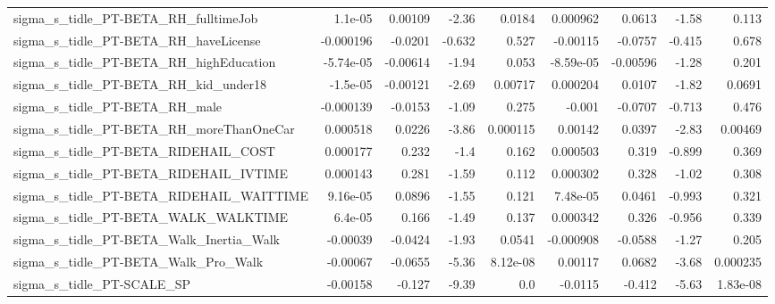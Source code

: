 \begin{tabular}{lrrrrrrrr}
sigma\_s\_tidle\_PT-BETA\_RH\_fulltimeJob               &     1.1e-05 &      0.00109 &    -2.36 &   0.0184 &   0.000962 &      0.0613 &        -1.58 &         0.113 \\
sigma\_s\_tidle\_PT-BETA\_RH\_haveLicense               &   -0.000196 &      -0.0201 &   -0.632 &    0.527 &   -0.00115 &     -0.0757 &       -0.415 &         0.678 \\
sigma\_s\_tidle\_PT-BETA\_RH\_highEducation             &   -5.74e-05 &     -0.00614 &    -1.94 &    0.053 &  -8.59e-05 &    -0.00596 &        -1.28 &         0.201 \\
sigma\_s\_tidle\_PT-BETA\_RH\_kid\_under18               &    -1.5e-05 &     -0.00121 &    -2.69 &  0.00717 &   0.000204 &      0.0107 &        -1.82 &        0.0691 \\
sigma\_s\_tidle\_PT-BETA\_RH\_male                      &   -0.000139 &      -0.0153 &    -1.09 &    0.275 &     -0.001 &     -0.0707 &       -0.713 &         0.476 \\
sigma\_s\_tidle\_PT-BETA\_RH\_moreThanOneCar            &    0.000518 &       0.0226 &    -3.86 & 0.000115 &    0.00142 &      0.0397 &        -2.83 &       0.00469 \\
sigma\_s\_tidle\_PT-BETA\_RIDEHAIL\_COST                &    0.000177 &        0.232 &     -1.4 &    0.162 &   0.000503 &       0.319 &       -0.899 &         0.369 \\
sigma\_s\_tidle\_PT-BETA\_RIDEHAIL\_IVTIME              &    0.000143 &        0.281 &    -1.59 &    0.112 &   0.000302 &       0.328 &        -1.02 &         0.308 \\
sigma\_s\_tidle\_PT-BETA\_RIDEHAIL\_WAITTIME            &    9.16e-05 &       0.0896 &    -1.55 &    0.121 &   7.48e-05 &      0.0461 &       -0.993 &         0.321 \\
sigma\_s\_tidle\_PT-BETA\_WALK\_WALKTIME                &     6.4e-05 &        0.166 &    -1.49 &    0.137 &   0.000342 &       0.326 &       -0.956 &         0.339 \\
sigma\_s\_tidle\_PT-BETA\_Walk\_Inertia\_Walk            &    -0.00039 &      -0.0424 &    -1.93 &   0.0541 &  -0.000908 &     -0.0588 &        -1.27 &         0.205 \\
sigma\_s\_tidle\_PT-BETA\_Walk\_Pro\_Walk                &    -0.00067 &      -0.0655 &    -5.36 & 8.12e-08 &    0.00117 &      0.0682 &        -3.68 &      0.000235 \\
sigma\_s\_tidle\_PT-SCALE\_SP                          &    -0.00158 &       -0.127 &    -9.39 &      0.0 &    -0.0115 &      -0.412 &        -5.63 &      1.83e-08 \\

\end{tabular}
